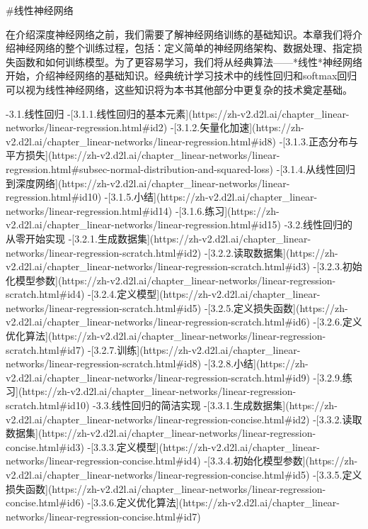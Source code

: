 #线性神经网络

在介绍深度神经网络之前，我们需要了解神经网络训练的基础知识。本章我们将介绍神经网络的整个训练过程，包括：定义简单的神经网络架构、数据处理、指定损失函数和如何训练模型。为了更容易学习，我们将从经典算法------*线性*神经网络开始，介绍神经网络的基础知识。经典统计学习技术中的线性回归和softmax回归可以视为线性神经网络，这些知识将为本书其他部分中更复杂的技术奠定基础。

-3.1.线性回归
-[3.1.1.线性回归的基本元素](https://zh-v2.d2l.ai/chapter_linear-networks/linear-regression.html#id2)
-[3.1.2.矢量化加速](https://zh-v2.d2l.ai/chapter_linear-networks/linear-regression.html#id8)
-[3.1.3.正态分布与平方损失](https://zh-v2.d2l.ai/chapter_linear-networks/linear-regression.html#subsec-normal-distribution-and-squared-loss)
-[3.1.4.从线性回归到深度网络](https://zh-v2.d2l.ai/chapter_linear-networks/linear-regression.html#id10)
-[3.1.5.小结](https://zh-v2.d2l.ai/chapter_linear-networks/linear-regression.html#id14)
-[3.1.6.练习](https://zh-v2.d2l.ai/chapter_linear-networks/linear-regression.html#id15)
-3.2.线性回归的从零开始实现
-[3.2.1.生成数据集](https://zh-v2.d2l.ai/chapter_linear-networks/linear-regression-scratch.html#id2)
-[3.2.2.读取数据集](https://zh-v2.d2l.ai/chapter_linear-networks/linear-regression-scratch.html#id3)
-[3.2.3.初始化模型参数](https://zh-v2.d2l.ai/chapter_linear-networks/linear-regression-scratch.html#id4)
-[3.2.4.定义模型](https://zh-v2.d2l.ai/chapter_linear-networks/linear-regression-scratch.html#id5)
-[3.2.5.定义损失函数](https://zh-v2.d2l.ai/chapter_linear-networks/linear-regression-scratch.html#id6)
-[3.2.6.定义优化算法](https://zh-v2.d2l.ai/chapter_linear-networks/linear-regression-scratch.html#id7)
-[3.2.7.训练](https://zh-v2.d2l.ai/chapter_linear-networks/linear-regression-scratch.html#id8)
-[3.2.8.小结](https://zh-v2.d2l.ai/chapter_linear-networks/linear-regression-scratch.html#id9)
-[3.2.9.练习](https://zh-v2.d2l.ai/chapter_linear-networks/linear-regression-scratch.html#id10)
-3.3.线性回归的简洁实现
-[3.3.1.生成数据集](https://zh-v2.d2l.ai/chapter_linear-networks/linear-regression-concise.html#id2)
-[3.3.2.读取数据集](https://zh-v2.d2l.ai/chapter_linear-networks/linear-regression-concise.html#id3)
-[3.3.3.定义模型](https://zh-v2.d2l.ai/chapter_linear-networks/linear-regression-concise.html#id4)
-[3.3.4.初始化模型参数](https://zh-v2.d2l.ai/chapter_linear-networks/linear-regression-concise.html#id5)
-[3.3.5.定义损失函数](https://zh-v2.d2l.ai/chapter_linear-networks/linear-regression-concise.html#id6)
-[3.3.6.定义优化算法](https://zh-v2.d2l.ai/chapter_linear-networks/linear-regression-concise.html#id7)
